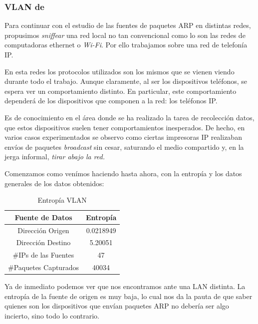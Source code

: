\subsubsection{VLAN de~}
\par Para continuar con el estudio de las fuentes de paquetes ARP en distintas redes,
propusimos \textit{sniffear} una red local no tan convencional como lo son las
redes de computadoras ethernet o \textit{Wi-Fi}. Por ello trabajamos sobre una
red de telefon\'ia IP.

\par En esta redes los protocolos utilizados son los mismos que se vienen viendo
durante todo el trabajo. Aunque claramente, al ser los dispositivos tel\'efonos,
se espera ver un comportamiento distinto. En particular, este comportamiento
depender\'a de los dispositivos que componen a la red: los tel\'efonos IP.

\par Es de conocimiento en el \'area donde se ha realizado la tarea de recolecci\'on
datos, que estos dispositivos suelen tener comportamientos inesperados. De hecho,
en varios casos experimentados se observo como ciertas impresoras IP realizaban
env\'ios de paquetes \textit{broadcast} sin cesar, saturando el medio compartido
y, en la jerga informal, \textit{tirar abajo la red.}

\par Comenzamos como ven\'imos haciendo hasta ahora, con la entrop\'ia y los
datos generales de los datos obtenidos:

\begin{table}[!h]
\centering
  \begin{tabular}{c c}
    Fuente de Datos & Entrop\'ia \\
    \hline\hline
    Direcci\'on Origen & 0.0218949 \\
    Direcci\'on Destino & 5.20051 \\
    \hline\hline
    \#IPs de las Fuentes & 47\\
    \#Paquetes Capturados & 40034 \\
    \hline
    \end{tabular}
  \bigskip
  \caption{Entrop\'ia VLAN }
  \label{tab:vlan40_entropia}
\end{table}

\par Ya de inmediato podemos ver que nos encontramos ante una LAN distinta. La entrop\'ia
de la fuente de origen es muy baja, lo cual nos da la pauta de que saber quienes son
los dispositivos que env\'ian paquetes ARP no deber\'ia ser algo incierto, sino todo
lo contrario.

